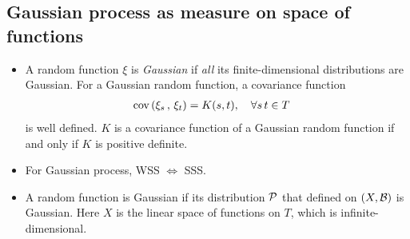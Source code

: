 \documentclass[11pt]{article}
\begin{document}
\subsection{Gaussian process as measure on space of functions}
\begin{itemize}
\item A random function $\xi$ is \emph{Gaussian} if \emph{all} its finite-dimensional distributions are Gaussian. For a Gaussian random function, a covariance function 
\begin{align*}
\text{cov}\left( \xi_{s}\,,\, \xi_{t} \right) &= K(s,t),\quad \forall s\,t \in T
\end{align*} is well defined. $K$ is a covariance function of a Gaussian random function if and only if $K$ is positive definite. 


\item For Gaussian process, WSS $\Leftrightarrow$ SSS.

\item A random function is Gaussian if its distribution ${\mathcal P}$ that defined on $(X, {\mathcal B})$ is Gaussian. Here $X$ is the linear space of functions on $T$, which is infinite-dimensional. 
\end{itemize}

\newpage
\end{document}
